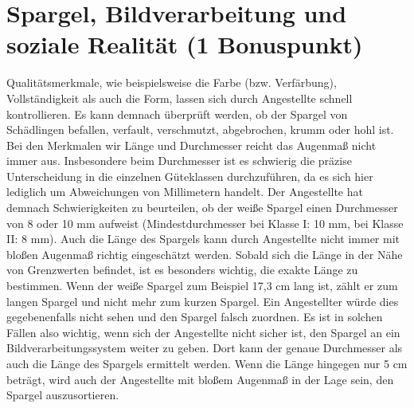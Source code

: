 \documentclass{ezb}
\begin{document}
\section{Spargel, Bildverarbeitung und soziale Realität (1 Bonuspunkt)}
Qualitätsmerkmale, wie beispielsweise die Farbe (bzw. Verfärbung), Vollständigkeit als auch die Form, lassen sich durch Angestellte schnell kontrollieren. Es kann demnach überprüft werden, ob der Spargel von Schädlingen befallen, verfault, verschmutzt, abgebrochen, krumm oder hohl ist. Bei den Merkmalen wir Länge und Durchmesser reicht das Augenmaß nicht immer aus. Insbesondere beim Durchmesser ist es schwierig die präzise Unterscheidung in die einzelnen Güteklassen durchzuführen, da es sich hier lediglich um Abweichungen von Millimetern handelt. Der Angestellte hat demnach Schwierigkeiten zu beurteilen, ob der weiße Spargel einen Durchmesser von 8 oder 10 mm aufweist (Mindestdurchmesser bei Klasse I: 10 mm, bei Klasse II: 8 mm). Auch die Länge des Spargels kann durch Angestellte nicht immer mit bloßen Augenmaß richtig eingeschätzt werden. Sobald sich die Länge in der Nähe von Grenzwerten befindet, ist es besonders wichtig, die exakte Länge zu bestimmen. Wenn der weiße Spargel zum Beispiel 17,3 cm lang ist, zählt er zum langen Spargel und nicht mehr zum kurzen Spargel. Ein Angestellter würde dies gegebenenfalls nicht sehen und den Spargel falsch zuordnen. Es ist in solchen Fällen also wichtig, wenn sich der Angestellte nicht sicher ist, den Spargel an ein Bildverarbeitungssystem weiter zu geben. Dort kann der genaue Durchmesser als auch die Länge des Spargels ermittelt werden. Wenn die Länge hingegen nur 5 cm beträgt, wird auch der Angestellte mit bloßem Augenmaß in der Lage sein, den Spargel auszusortieren. 

\end{document}
